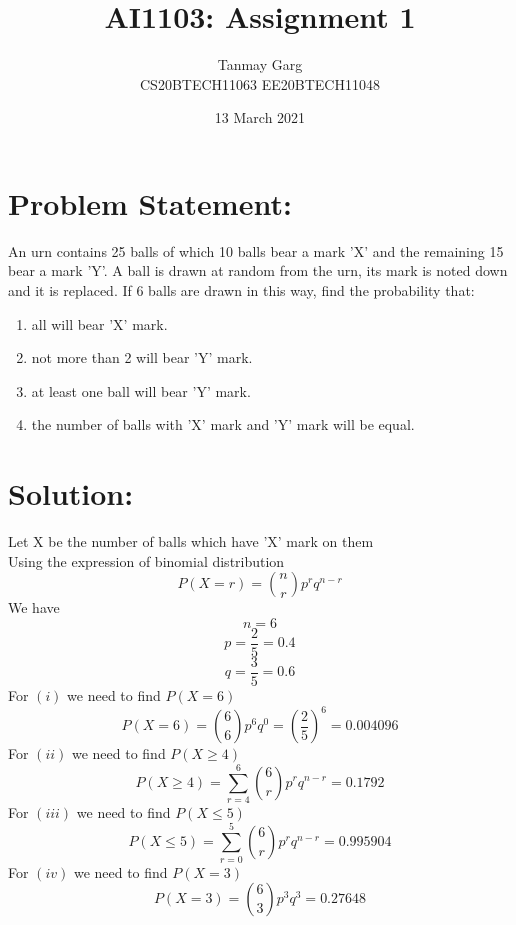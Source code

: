 \documentclass{article}
\title{AI1103: Assignment 1}
\author{Tanmay Garg \\ CS20BTECH11063 EE20BTECH11048}
\date{13 March 2021}
\begin{document}
\maketitle

\section*{Problem Statement: }
An urn contains 25 balls of which 10 balls
bear a mark ’X’ and the remaining 15 bear a
mark ’Y’.
A ball is drawn at random from the
urn, its mark is noted down and it is replaced.
If 6 balls are drawn in this way, find the
probability that:
\begin{enumerate}
    \item all will bear 'X' mark.
    \item not more than 2 will bear 'Y' mark.
    \item at least one ball will bear 'Y' mark.
    \item the number of balls with 'X' mark and 'Y' mark will be equal.
\end{enumerate}

\section*{Solution:}
Let X be the number of balls which have 'X' mark on them\\
Using the expression of binomial distribution
\[P(X = r) = {n \choose r} p^r q^{n-r}\]
We have
\[n = 6\]
\[p = \frac{2}{5} = 0.4\] 
\[q = \frac{3}{5} = 0.6\] 
For \((i)\) we need to find \(P(X = 6)\)
\[P(X = 6) = {6 \choose 6} p^6 q^0 = \left(\frac{2}{5} \right)^6 = 0.004096\]
For \((ii)\) we need to find \(P(X \geq 4)\)
\[P(X \geq 4) = \sum_{r = 4}^6 {6 \choose r} p^r q^{n-r} = 0.1792\]
For \((iii)\) we need to find \(P(X \leq 5)\)
\[P(X \leq 5) = \sum_{r = 0}^5 {6 \choose r} p^r q^{n - r} = 0.995904\]
For \((iv)\) we need to find \(P(X = 3)\)
\[P(X = 3) = {6 \choose 3} p^3 q^3 = 0.27648\]
\end{document}
